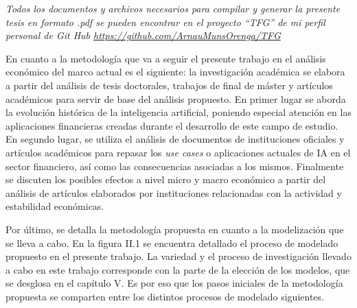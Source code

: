\documentclass[]{DissertateUSU}
\begin{document}
\noindent \emph{Todos los documentos y archivos necesarios para compilar
y generar la presente tesis en formato .pdf se pueden encontrar en el
proyecto ``TFG'' de mi perfil personal de Git Hub
\url{https://github.com/ArnauMunsOrenga/TFG}}

\noindent En cuanto a la metodología que va a seguir el presente trabajo
en el análisis económico del marco actual es el siguiente: la
investigación académica se elabora a partir del análisis de tesis
doctorales, trabajos de final de máster y artículos académicos para
servir de base del análisis propuesto. En primer lugar se aborda la
evolución histórica de la inteligencia artificial, poniendo especial
atención en las aplicaciones financieras creadas durante el desarrollo
de este campo de estudio. En segundo lugar, se utiliza el análisis de
documentos de instituciones oficiales y artículos académicos para
repasar los \emph{use cases} o aplicaciones actuales de IA en el sector
financiero, así como las consecuencias asociadas a los mismos.
Finalmente se discuten los posibles efectos a nivel micro y macro
económico a partir del análisis de artículos elaborados por
instituciones relacionadas con la actividad y estabilidad económicas.

\noindent Por último, se detalla la metodología propuesta en cuanto a la
modelización que se lleva a cabo. En la figura II.1 se encuentra
detallado el proceso de modelado propuesto en el presente trabajo. La
variedad y el proceso de investigación llevado a cabo en este trabajo
corresponde con la parte de la elección de los modelos, que se desglosa
en el capítulo V. Es por eso que los pasos iniciales de la metodología
propuesta se comparten entre los distintos procesos de modelado
siguientes.

\centering
\end{document}
